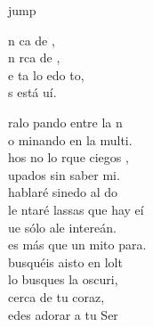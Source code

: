 \begin{cancion}jump\\
	\begin{chorus}%
		n ca de , \\
		n rca de ,\\
		e ta lo edo to,\\
		s está uí.\jump\\
	\end{chorus}%
	ralo pando entre la n\\
	o minando en la multi. \\
	hos no lo  rque ciegos ,\\
	upados sin saber mi. \\
	\jump
	 hablaré sinedo al do\\
	le ntaré lassas que hay eí\\
	ue sólo ale intereán.\\
	 es más que un mito para.\\
	\jump
	 busquéis aisto en lolt \\
	 lo busques la oscuri, \\
	 cerca de   tu coraz,\\
	edes adorar a tu Ser \\
\end{cancion}%
